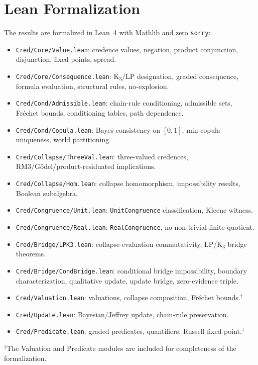 \documentclass[11pt,a4paper]{article}
\begin{document}



\appendix

\section{Lean Formalization}
\label{app:lean}

The results are formalized in Lean~4 with Mathlib and zero
\texttt{sorry}:

\begin{itemize}[nosep]
\item \texttt{Cred/Core/Value.lean}: credence values, negation,
  product conjunction, disjunction, fixed points, spread.
\item \texttt{Cred/Core/Consequence.lean}: K$_3$/LP designation,
  graded consequence, formula evaluation, structural rules,
  no-explosion.
\item \texttt{Cred/Cond/Admissible.lean}: chain-rule conditioning,
  admissible sets, Fr\'echet bounds, conditioning tables,
  path dependence.
\item \texttt{Cred/Cond/Copula.lean}: Bayes consistency on $[0,1]$,
  min-copula uniqueness, world partitioning.
\item \texttt{Cred/Collapse/ThreeVal.lean}: three-valued credences,
  RM3/G\"odel/product-residuated implications.
\item \texttt{Cred/Collapse/Hom.lean}: collapse homomorphism,
  impossibility results, Boolean subalgebra.
\item \texttt{Cred/Congruence/Unit.lean}: \texttt{UnitCongruence}
  classification, Kleene witness.
\item \texttt{Cred/Congruence/Real.lean}: \texttt{RealCongruence},
  no non-trivial finite quotient.
\item \texttt{Cred/Bridge/LPK3.lean}: collapse-evaluation
  commutativity, LP/K$_3$ bridge theorems.
\item \texttt{Cred/Bridge/CondBridge.lean}: conditional bridge
  impossibility, boundary characterization, qualitative update,
  update bridge, zero-evidence triple.
\item \texttt{Cred/Valuation.lean}: valuations, collapse composition,
  Fr\'echet bounds.$^\dagger$
\item \texttt{Cred/Update.lean}: Bayesian/Jeffrey update, chain-rule
  preservation.
\item \texttt{Cred/Predicate.lean}: graded predicates,
  quantifiers, Russell fixed point.$^\dagger$
\end{itemize}
\smallskip
\noindent
{\footnotesize $^\dagger$The Valuation and Predicate modules
are included for completeness of the formalization.}
\end{document}
